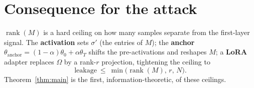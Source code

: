 \documentclass[11pt]{article}
\theoremstyle{definition}
\newcommand{\rank}{\operatorname{rank}}
\newcommand{\Om}{\Omega}
\begin{document}
\section{Consequence for the attack}
$\rank(M)$ is a hard ceiling on how many samples separate from the first-layer signal. The
\textbf{activation} sets $\sigma'$ (the entries of $M$); the \textbf{anchor}
$\theta_{\mathrm{anchor}}=(1-\alpha)\theta_0+\alpha\theta_T$ shifts the pre-activations and
reshapes $M$; a \textbf{LoRA} adapter replaces $\Om$ by a rank-$r$ projection, tightening the
ceiling to
\[
\text{leakage}\ \le\ \min\big(\rank(M),\,r,\,N\big).
\]
Theorem~\ref{thm:main} is the first, information-theoretic, of these ceilings.
\end{document}
